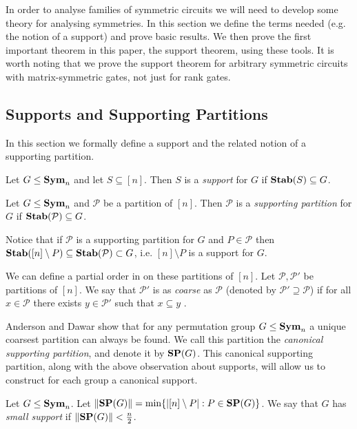 \documentclass[../paper.tex]{subfiles}
\begin{document}
In order to analyse families of symmetric circuits we will need to develop some
theory for analysing symmetries. In this section we define the terms needed
(e.g. the notion of a support) and prove basic results. We then prove the first
important theorem in this paper, the support theorem, using these tools. It is
worth noting that we prove the support theorem for arbitrary symmetric circuits
with matrix-symmetric gates, not just for rank gates.

\subsection{Supports and Supporting Partitions}
In this section we formally define a support and the related notion of a
supporting partition.

\begin{definition}
  Let $G \leq \text{\textbf{Sym}}_n$ and let $S \subseteq [n]$. Then $S$ is a \emph{support}
  for $G$ if $\text{\textbf{Stab}}(S) \subseteq G$.
\end{definition}

\begin{definition}
  Let $G \leq \text{\textbf{Sym}}_n$ and $\mathcal{P}$ be a partition of $[n]$. Then
  $\mathcal{P}$ is a \emph{supporting partition} for $G$ if $\text{\textbf{Stab}}(\mathcal{P})
  \subseteq G$.
\end{definition}

Notice that if $\mathcal{P}$ is a supporting partition for $G$ and $P \in
\mathcal{P}$ then $\text{\textbf{Stab}}([n] \setminus P) \subseteq \text{\textbf{Stab}}(\mathcal{P}) \subset
G$, i.e. $[n] \setminus P$ is a support for $G$.

We can define a partial order in on these partitions of $[n]$. Let $\mathcal{P},
\mathcal{P}'$ be partitions of $[n]$. We say that $\mathcal{P}'$ is as
\emph{coarse} as $\mathcal{P}$ (denoted by $\mathcal{P}' \supseteq \mathcal{P}$)
if for all $x \in \mathcal{P}$ there exists $y \in \mathcal{P}'$ such that $x
\subseteq y$ \cite{AndersonD17}.

Anderson and Dawar \cite{AndersonD17} show that for any permutation group $G
\leq \text{\textbf{Sym}}_n$ a unique coarsest partition can always be found. We call this
partition the \emph{canonical supporting partition}, and denote it by $\text{\textbf{SP}} (G)$.
This canonical supporting partition, along with the above observation about
supports, will allow us to construct for each group a canonical support.

\begin{definition}
  Let $G \leq \text{\textbf{Sym}}_n$. Let $\| \text{\textbf{SP}}(G) \| = \min \{\vert [n] \setminus P \vert :
  P \in \text{\textbf{SP}}(G) \}$. We say that $G$ has \emph{small support} if $\| \text{\textbf{SP}}(G) \| <
  \frac{n}{2}$.
\end{definition}
\end{document}
